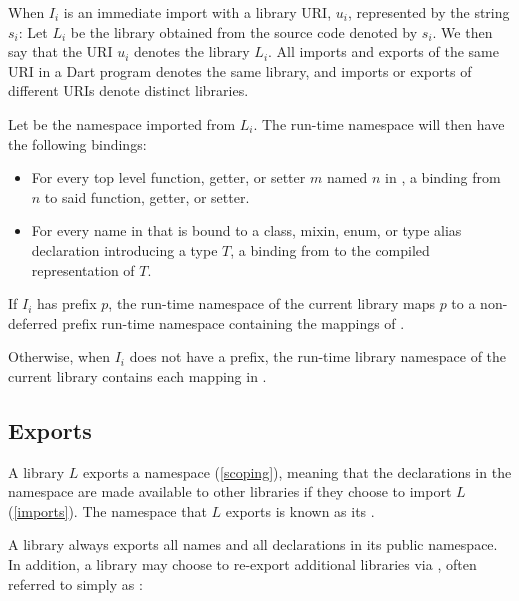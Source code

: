 \documentclass[makeidx]{article}
\begin{document}
{\LMHash{}%
When $I_i$ is an immediate import with a library URI, $u_i$,
represented by the string $s_i$:
Let $L_i$ be the library obtained from the source code denoted by $s_i$.
We then say that the URI $u_i$ denotes the library $L_i$.
All imports and exports of the same URI in a Dart program denotes
the same library,
and imports or exports of different URIs denote distinct libraries.

\LMHash{}%
Let  be the namespace imported from $L_i$.
The run-time namespace  will then have the following bindings:

\begin{itemize}
\item
  For every top level function, getter, or setter $m$ named $n$ in
  ,
  a binding from $n$ to said function, getter, or setter.
\item
  For every name \id{} in 
  that is bound to a class, mixin, enum, or type alias declaration
  introducing a type $T$,
  a binding from \id{} to the compiled representation of $T$.
\end{itemize}

\LMHash{}%
If $I_i$ has prefix $p$,
the run-time namespace of the current library
maps $p$ to a non-deferred prefix run-time namespace 
containing the mappings of .


\LMHash{}%
Otherwise, when $I_i$ does not have a prefix,
the run-time library namespace of the current library
contains each mapping in .
\EndCase


\subsection{Exports}

\LMHash{}%
A library $L$ exports a namespace (\ref{scoping}), meaning that
the declarations in the namespace are made available to other libraries
if they choose to import $L$ (\ref{imports}).
The namespace that $L$ exports is known as its
.

\LMHash{}%
A library always exports all names and all declarations in its public namespace.
In addition, a library may choose to re-export additional libraries
via , often referred to simply as :

}
\end{document}
